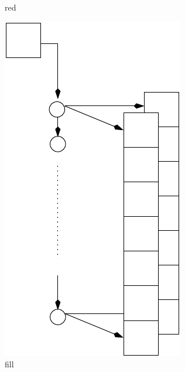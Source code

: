 \begin{figure}[t!]
\begin{subfigure}[t]{0.22\textwidth}
  \caption{red}
  \label{fig:red}
\end{subfigure}
\begin{subfigure}[t]{0.25\textwidth}
  \centering
  \includegraphics[scale=0.45]{fig/fill.pdf}
  \caption{fill}
  \label{fig:fill}
\end{subfigure}
\begin{subfigure}[t]{0.25\textwidth}
  \centering

\end{subfigure}
\end{figure}
